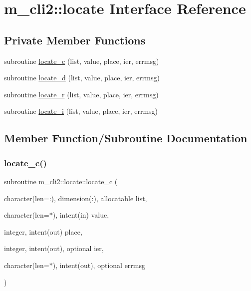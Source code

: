 \hypertarget{interfacem__cli2_1_1locate}{}\section{m\+\_\+cli2\+:\+:locate Interface Reference}
\label{interfacem__cli2_1_1locate}
\subsection*{Private Member Functions}
\begin{DoxyCompactItemize}
\item 
subroutine \mbox{\hyperlink{interfacem__cli2_1_1locate_a59a1546b8eab776a0ba5594b6b90ae72}{locate\+\_\+c}} (list, value, place, ier, errmsg)
\item 
subroutine \mbox{\hyperlink{interfacem__cli2_1_1locate_ac8d6a83fb2617b1a370d6f4142cfbf6b}{locate\+\_\+d}} (list, value, place, ier, errmsg)
\item 
subroutine \mbox{\hyperlink{interfacem__cli2_1_1locate_a93368b61603fe74c498b1190a502c271}{locate\+\_\+r}} (list, value, place, ier, errmsg)
\item 
subroutine \mbox{\hyperlink{interfacem__cli2_1_1locate_a4bc5036ad18af931624efb52459bdef3}{locate\+\_\+i}} (list, value, place, ier, errmsg)
\end{DoxyCompactItemize}


\subsection{Member Function/\+Subroutine Documentation}
\mbox{\label{interfacem__cli2_1_1locate_a59a1546b8eab776a0ba5594b6b90ae72}} 
\subsubsection{\texorpdfstring{locate\+\_\+c()}{locate\_c()}}
{\footnotesize\ttfamily subroutine m\+\_\+cli2\+::locate\+::locate\+\_\+c (\begin{DoxyParamCaption}\item[{character(len=\+:), dimension(\+:), allocatable}]{list,  }\item[{character(len=$\ast$), intent(in)}]{value,  }\item[{integer, intent(out)}]{place,  }\item[{integer, intent(out), optional}]{ier,  }\item[{character(len=$\ast$), intent(out), optional}]{errmsg }\end{DoxyParamCaption})\hspace{0.3cm}{\ttfamily [private]}}

